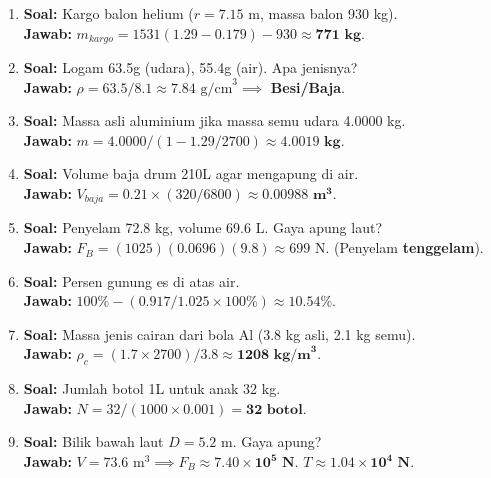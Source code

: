 \documentclass{article}
\begin{document}
\begin{enumerate}[label=\textbf{\arabic*.}]
    \item \textbf{Soal:} Kargo balon helium ($r = 7.15 \text{ m}$, massa balon 930 kg). \\
    \textbf{Jawab:} $m_{kargo} = 1531(1.29-0.179) - 930 \approx \mathbf{771 \text{ kg}}$.

    \item \textbf{Soal:} Logam 63.5g (udara), 55.4g (air). Apa jenisnya? \\
    \textbf{Jawab:} $\rho = 63.5/8.1 \approx 7.84 \text{ g/cm}^3 \implies$ \textbf{Besi/Baja}.

    \item \textbf{Soal:} Massa asli aluminium jika massa semu udara 4.0000 kg. \\
    \textbf{Jawab:} $m = 4.0000 / (1 - 1.29/2700) \approx \mathbf{4.0019 \text{ kg}}$.

    \item \textbf{Soal:} Volume baja drum 210L agar mengapung di air. \\
    \textbf{Jawab:} $V_{baja} = 0.21 \times (320/6800) \approx \mathbf{0.00988 \text{ m}^3}$.

    \item \textbf{Soal:} Penyelam 72.8 kg, volume 69.6 L. Gaya apung laut? \\
    \textbf{Jawab:} $F_B = (1025)(0.0696)(9.8) \approx 699 \text{ N}$. (Penyelam \textbf{tenggelam}).

    \item \textbf{Soal:} Persen gunung es di atas air. \\
    \textbf{Jawab:} $100\% - (0.917/1.025 \times 100\%) \approx \mathbf{10.54\%}$.

    \item \textbf{Soal:} Massa jenis cairan dari bola Al (3.8 kg asli, 2.1 kg semu). \\
    \textbf{Jawab:} $\rho_c = (1.7 \times 2700)/3.8 \approx \mathbf{1208 \text{ kg/m}^3}$.

    \item \textbf{Soal:} Jumlah botol 1L untuk anak 32 kg. \\
    \textbf{Jawab:} $N = 32/(1000 \times 0.001) = \mathbf{32 \text{ botol}}$.

    \item \textbf{Soal:} Bilik bawah laut $D = 5.2 \text{ m}$. Gaya apung? \\
    \textbf{Jawab:} $V = 73.6 \text{ m}^3 \implies F_B \approx \mathbf{7.40 \times 10^5 \text{ N}}$. $T \approx \mathbf{1.04 \times 10^4 \text{ N}}$.


\end{enumerate}
\end{document}
